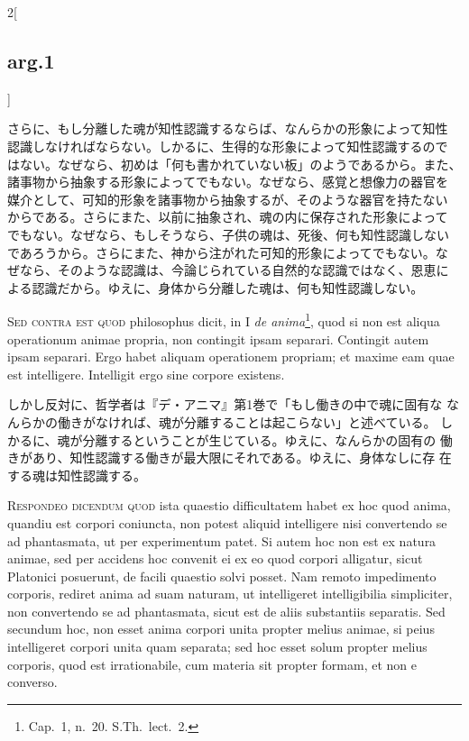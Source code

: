 \documentclass[paper=a4paper,fontsize=10pt,jafontsize=9pt,titlepage]{jlreq}
\begin{document}
\begin{paracol}{2}[\subsection{arg.1}]
\switchcolumn

さらに、もし分離した魂が知性認識するならば、なんらかの形象によって知性
認識しなければならない。しかるに、生得的な形象によって知性認識するので
はない。なぜなら、初めは「何も書かれていない板」のようであるから。また、
諸事物から抽象する形象によってでもない。なぜなら、感覚と想像力の器官を
媒介として、可知的形象を諸事物から抽象するが、そのような器官を持たない
からである。さらにまた、以前に抽象され、魂の内に保存された形象によって
でもない。なぜなら、もしそうなら、子供の魂は、死後、何も知性認識しない
であろうから。さらにまた、神から注がれた可知的形象によってでもない。な
ぜなら、そのような認識は、今論じられている自然的な認識ではなく、恩恵に
よる認識だから。ゆえに、身体から分離した魂は、何も知性認識しない。

\switchcolumn*[\subsection{s.c.}]

{\scshape Sed contra est quod} philosophus dicit, in I {\itshape de
anima}\footnote{Cap.~1, n.~20. S.Th.~lect.~2.}, quod si non est aliqua
operationum animae propria, non contingit ipsam separari. Contingit
autem ipsam separari. Ergo habet aliquam operationem propriam; et
maxime eam quae est intelligere. Intelligit ergo sine corpore
existens.

\switchcolumn

しかし反対に、哲学者は『デ・アニマ』第1巻で「もし働きの中で魂に固有な
なんらかの働きがなければ、魂が分離することは起こらない」と述べている。
しかるに、魂が分離するということが生じている。ゆえに、なんらかの固有の
働きがあり、知性認識する働きが最大限にそれである。ゆえに、身体なしに存
在する魂は知性認識する。


{\scshape Respondeo dicendum quod} ista quaestio difficultatem habet ex hoc
quod anima, quandiu est corpori coniuncta, non potest aliquid
intelligere nisi convertendo se ad phantasmata, ut per experimentum
patet. Si autem hoc non est ex natura animae, sed per accidens hoc
convenit ei ex eo quod corpori alligatur,
sicut Platonici posuerunt, de facili quaestio solvi posset. Nam remoto
impedimento corporis, rediret anima ad suam naturam, ut intelligeret
intelligibilia simpliciter, non convertendo se ad phantasmata, sicut
est de aliis substantiis separatis. Sed secundum hoc, non esset anima
corpori unita propter melius animae, si peius intelligeret corpori
unita quam separata; sed hoc esset solum propter melius corporis, quod
est irrationabile, cum materia sit propter formam, et non e converso.


\end{paracol}
\end{document}
